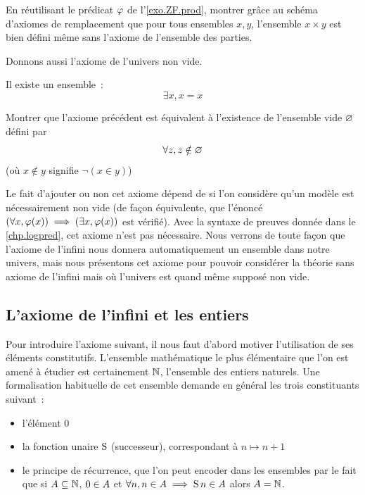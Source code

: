 \begin{exercise}\label{exo.ZF.prod2}
  En réutilisant le prédicat $\varphi$ de l'\cref{exo.ZF.prod}, montrer grâce au
  schéma d'axiomes de remplacement que pour tous ensembles $x,y$, l'ensemble
  $x\times y$ est bien défini même sans l'axiome de l'ensemble des parties.
\end{exercise}

\noindent
Donnons aussi l'axiome de l'univers non vide.

\begin{axiom}\label{ax.ZF.nonEmpty}
  Il existe un ensemble~:
  \[\exists x, x = x\]
\end{axiom}

\begin{exercise}
  Montrer que l'axiome précédent est équivalent à l'existence de l'ensemble vide
  $\varnothing$ défini par
  \[\forall z, z\notin \varnothing\]
  (où $x\notin y$ signifie $\lnot(x\in y)$) 
\end{exercise}

\begin{remark}
  Le fait d'ajouter ou non cet axiome dépend de si l'on considère qu'un modèle
  est nécessairement non vide (de façon équivalente, que l'énoncé
  $(\forall x, \varphi(x)) \implies (\exists x,\varphi(x))$ est vérifié). Avec
  la syntaxe de preuves donnée dans le \cref{chp.logpred}, cet axiome n'est pas
  nécessaire. Nous verrons de toute façon que l'axiome de l'infini nous donnera
  automatiquement un ensemble dans notre univers, mais nous présentons cet
  axiome pour pouvoir considérer la théorie sans axiome de l'infini mais où
  l'univers est quand même supposé non vide.
\end{remark}

\subsection{L'axiome de l'infini et les entiers}

Pour introduire l'axiome suivant, il nous faut d'abord motiver l'utilisation de
ses éléments constitutifs. L'ensemble mathématique le plus élémentaire que l'on
est amené à étudier est certainement $\mathbb N$, l'ensemble des entiers
naturels. Une formalisation habituelle de cet ensemble demande en général les
trois constituants suivant~:
\begin{itemize}
\item l'élément $0$
\item la fonction unaire $\operatorname{S}$ (successeur), correspondant à $n \mapsto n + 1$
\item le principe de récurrence, que l'on peut encoder dans les ensembles par le
  fait que si $A\subseteq\mathbb N$, $0 \in A$ et
  $\forall n, n\in A \implies \operatorname{S} n \in A$ alors $A = \mathbb N$.
\end{itemize}

